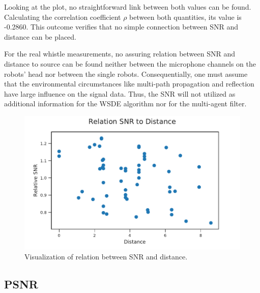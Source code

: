 Looking at the plot, no straightforward link between both values can be found.
Calculating the correlation coefficient $\rho$ between both quantities,
its value is -0.2860.
This outcome verifies that no simple connection between \ac{SNR} and distance
can be placed.

For the real whistle measurements, no assuring relation between \ac{SNR}
and distance to source can be found neither between the microphone
channels on the robots' head nor between the single robots.
Consequentially, one must assume that the environmental circumstances
like multi-path propagation and reflection have large influence
on the signal data.
Thus, the \ac{SNR} will not utilized as additional information
for the \ac{WSDE} algorithm nor for the multi-agent filter.
\begin{figure}[h]
	\centering
	\includegraphics[]{figures/evaluation/snr_scatter}
	\caption{Visualization of relation between SNR and distance.}
	\label{fig:04_snrDistance}
\end{figure}

\subsection{PSNR}
\label{subsec:04_psnr}

